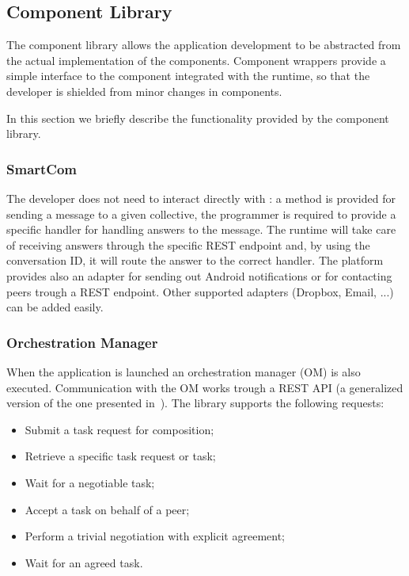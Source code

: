 \subsection{Component Library}
The component library allows the application development to be abstracted from the actual implementation of the components.
Component wrappers provide a simple interface to the component integrated with the runtime, so that the developer is shielded from minor changes in components. %

In this section we briefly describe the functionality %
provided by the component library. %
\subsubsection{SmartCom}
The developer does not need to interact directly with \mdl: 
a method is provided for sending a message to a given collective, the programmer is required to provide a specific handler for handling answers to the message. The runtime will take care of receiving answers through the specific REST endpoint 
and, by using the conversation ID, it will route the answer to the correct handler. The platform provides also an adapter for sending out Android notifications or for contacting peers trough a REST endpoint. Other supported adapters (Dropbox, Email, ...) can be added easily. 

\subsubsection{Orchestration Manager}
When the application is launched %
an orchestration manager (OM) is also executed. Communication with the OM works trough a REST API (a generalized version of the one presented in~\cite{D6.2}). %
The library supports the %
following requests:
\begin{itemize}
	\item Submit a task request for composition;
	\item Retrieve a specific task request or task;
	\item Wait for a negotiable task;
	\item Accept a task on behalf of a peer;
	\item Perform a trivial negotiation with explicit agreement; 
	\item Wait for an agreed task.
\end{itemize}

